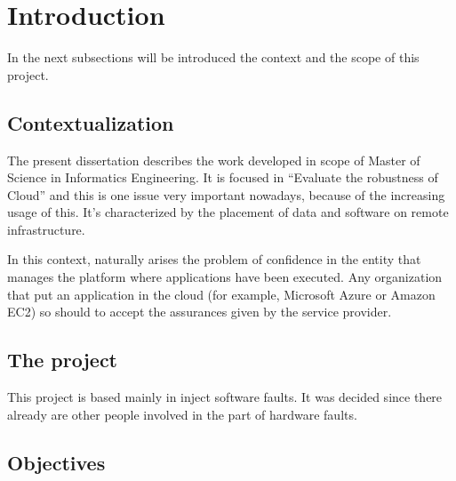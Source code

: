 \newpage
\section{Introduction}

In the next subsections will be introduced the context and the scope of this project.

\subsection{Contextualization}
The present dissertation describes the work developed in scope of Master of Science in Informatics Engineering. It is focused in ``Evaluate the robustness of Cloud'' and this is one issue very important nowadays, because of the increasing usage of this.
It's characterized by the placement of data and software on remote infrastructure. 

In this context, naturally arises the problem of confidence in the entity that manages the platform where applications have been executed. Any organization that put an application in the cloud (for example, Microsoft Azure or Amazon EC2) so should to accept the assurances given by the service provider.




\subsection{The project}

This project is based mainly in inject software faults. It was decided since there already are other people involved in the part of hardware faults.

\subsection{Objectives}

